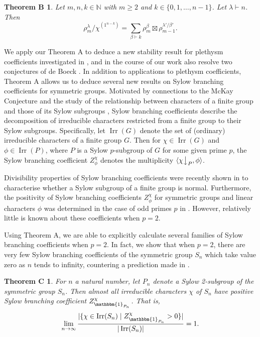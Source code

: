 \documentclass[ALCO, Unicode]{cedram}
\newcommand{\triv}{\mathbbm{1}}
\newcommand{\Irr}{\operatorname{Irr}}
\newcommand{\down}{\big\downarrow}
\newcommand{\N}{\mathbb{N}}
\newtheorem*{thmB}{Theorem B}
\newtheorem*{thmC}{Theorem C}
\begin{document}
\begin{thmB}
	Let $m,n,k\in\N$ with $m\ge 2$ and $k\in\{0,1,\dotsc,n-1\}$. Let $\lambda\vdash n$. Then
	\[ \rho^\lambda_m/\chi^{(1^{n-k})} = \sum_{\beta\vdash k} \rho^\beta_m \boxtimes \rho^{\lambda'/\beta'}_{m-1}. \]
\end{thmB}

We apply our Theorem A to deduce a new stability result for plethysm coefficients investigated in \cite{BBP}, and in the course of our work also resolve two conjectures of de Boeck \cite{dB-thesis}. 	
In addition to applications to plethysm coefficients, Theorem A allows us to deduce several new results on Sylow branching coefficients for symmetric groups. 
Motivated by connections to the McKay Conjecture \cite{GKNT, INOT} and the study of the relationship between characters of a finite group and those of its Sylow subgroups \cite{N,GN}, Sylow branching coefficients describe the decomposition of irreducible characters restricted from a finite group to their Sylow subgroups. Specifically, let $\Irr(G)$ denote the set of (ordinary) irreducible characters of a finite group $G$. Then for $\chi\in\Irr(G)$ and $\phi\in\Irr(P)$, where $P$ is a Sylow $p$-subgroup of $G$ for some given prime $p$, the Sylow branching coefficient $Z^\chi_\phi$ denotes the multiplicity $\langle \chi\down_P,\phi\rangle$.

Divisibility properties of Sylow branching coefficients were recently shown in \cite[Theorem A]{GLLV} to characterise whether a Sylow subgroup of a finite group is normal. Furthermore, the positivity of Sylow branching coefficients $Z^\chi_\phi$ for symmetric groups and linear characters $\phi$ was determined in the case of odd primes $p$ in \cite{GL1,GL2}. However, relatively little is known about these coefficients when $p=2$.

Using Theorem A, we are able to explicitly calculate several families of Sylow branching coefficients when $p=2$. In fact, we show that when $p=2$, there are very few Sylow branching coefficients of the symmetric group $S_n$ which take value zero as $n$ tends to infinity, countering a prediction made in \cite{GL1}.
\begin{thmC}
	For $n$ a natural number, let $P_n$ denote a Sylow 2-subgroup of the symmetric group $S_n$. Then almost all irreducible characters $\chi$ of $S_n$ have positive Sylow branching coefficient $Z^\chi_{\triv_{P_n}}$. That is,
	\[ \lim_{n\to\infty} \frac{|\{ \chi\in\Irr(S_n) \mid Z^\chi_{\triv_{P_n}} > 0\}|}{|\Irr(S_n)|} = 1. \]
\end{thmC}
\end{document}
